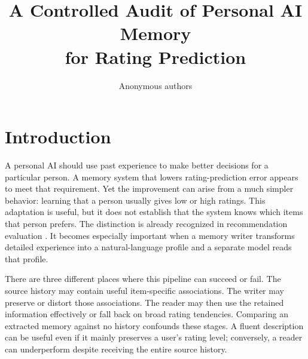 \documentclass{article}
\title{A Controlled Audit of Personal AI Memory\\for Rating Prediction}
\author{Anonymous authors}
\begin{document}
\ifdefined\tmlrcopy
\maketitle
\else
{}
\printAffiliationsAndNotice{}
\fi
{}
\ifdefined\anonymouscopy
{}
\fi
\begin{abstract}

\end{abstract}

\section{Introduction}
A personal AI should use past experience to make better decisions for a particular person. A memory system that lowers rating-prediction error appears to meet that requirement. Yet the improvement can arise from a much simpler behavior: learning that a person usually gives low or high ratings. This adaptation is useful, but it does not establish that the system knows which items that person prefers. The distinction is already recognized in recommendation evaluation \citep{tan2025preferences}. It becomes especially important when a memory writer transforms detailed experience into a natural-language profile and a separate model reads that profile.

There are three different places where this pipeline can succeed or fail. The source history may contain useful item-specific associations. The writer may preserve or distort those associations. The reader may then use the retained information effectively or fall back on broad rating tendencies. Comparing an extracted memory against no history confounds these stages. A fluent description can be useful even if it mainly preserves a user's rating level; conversely, a reader can underperform despite receiving the entire source history.
\end{document}
